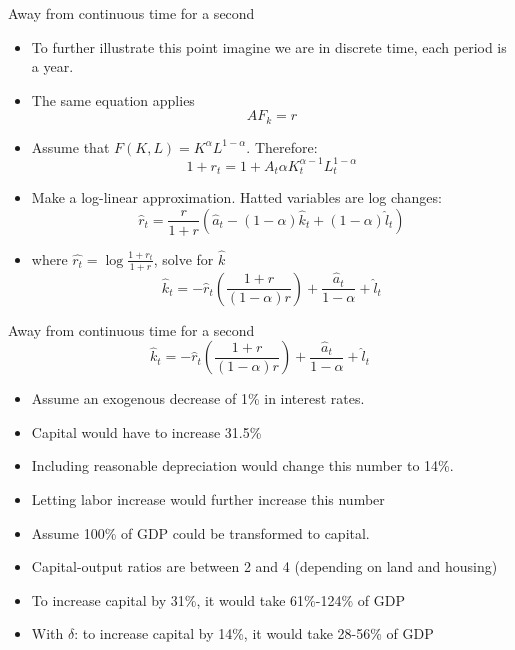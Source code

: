 \documentclass[11pt,aspectratio=169,xcolor={dvipsnames},hyperref={pdftex,pdfpagemode=UseNone,hidelinks,pdfdisplaydoctitle=true},usepdftitle=false]{beamer}
\begin{document}
\begin{frame}{Away from continuous time for a second}
\begin{itemize}
\item To further illustrate this point imagine we are in discrete time, each period is a year.
\pause
\item The same equation applies
$$A F_k = r $$
\pause
\item Assume that $F(K,L) = K^{\alpha}L^{1-\alpha}$. Therefore:
$$1+r_t = 1+ A_t \alpha K_t^{\alpha-1}L_t^{1-\alpha}$$
\vspace{-0.5cm}
\pause
\item Make a log-linear approximation. Hatted variables are log changes:
$$\hat{r}_t = \frac{r}{1+r}\left(\hat{a}_t - (1-\alpha) \hat{k}_t + (1-\alpha) \hat{l}_t\right)$$
\vspace{-0.5cm}
\pause
\item where $\hat{r_t} = \log \frac{1+r_t}{1+r}$, solve for $\hat{k}$
$$\hat{k}_t = - \hat{r}_t \left(\frac{1+r}{(1-\alpha)r}\right) + \frac{\hat{a}_t}{1-\alpha} + \hat{l}_t$$
\vspace{-0.5cm}
\end{itemize}
\end{frame}

\begin{frame}{Away from continuous time for a second}
$$\hat{k}_t = - \hat{r}_t \left(\frac{1+r}{(1-\alpha)r}\right) + \frac{\hat{a}_t}{1-\alpha} + \hat{l}_t$$
\begin{itemize}
\pause
\item Assume an exogenous decrease of 1\% in interest rates.
\pause
\item Capital would have to increase 31.5\%  
\pause
\item Including reasonable depreciation would change this number to 14\%.
\pause
\item Letting labor increase would further increase this number
\pause
\item Assume 100\% of GDP could be transformed to capital.
\pause
\item Capital-output ratios are between 2 and 4 (depending on land and housing)
\pause
\item To increase capital by 31\%, it would take 61\%-124\% of GDP
\item With $\delta$: to increase capital by 14\%, it would take 28-56\% of GDP
\end{itemize}
\end{frame}
\end{document}
